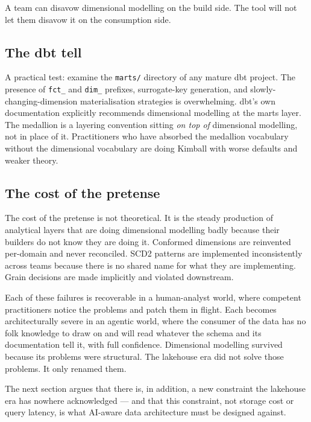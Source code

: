 \documentclass[11pt,a4paper]{article}
\begin{document}
A team can disavow dimensional modelling on the build side. The tool will not let them disavow it on the consumption side.

\subsection{The dbt tell}

A practical test: examine the \texttt{marts/} directory of any mature dbt project. The presence of \texttt{fct\_} and \texttt{dim\_} prefixes, surrogate-key generation, and slowly-changing-dimension materialisation strategies is overwhelming. dbt's own documentation explicitly recommends dimensional modelling at the marts layer. The medallion is a layering convention sitting \emph{on top of} dimensional modelling, not in place of it. Practitioners who have absorbed the medallion vocabulary without the dimensional vocabulary are doing Kimball with worse defaults and weaker theory.

\subsection{The cost of the pretense}

The cost of the pretense is not theoretical. It is the steady production of analytical layers that are doing dimensional modelling badly because their builders do not know they are doing it. Conformed dimensions are reinvented per-domain and never reconciled. SCD2 patterns are implemented inconsistently across teams because there is no shared name for what they are implementing. Grain decisions are made implicitly and violated downstream.

Each of these failures is recoverable in a human-analyst world, where competent practitioners notice the problems and patch them in flight. Each becomes architecturally severe in an agentic world, where the consumer of the data has no folk knowledge to draw on and will read whatever the schema and its documentation tell it, with full confidence. Dimensional modelling survived because its problems were structural. The lakehouse era did not solve those problems. It only renamed them.

The next section argues that there is, in addition, a new constraint the lakehouse era has nowhere acknowledged --- and that this constraint, not storage cost or query latency, is what AI-aware data architecture must be designed against.

\end{document}
